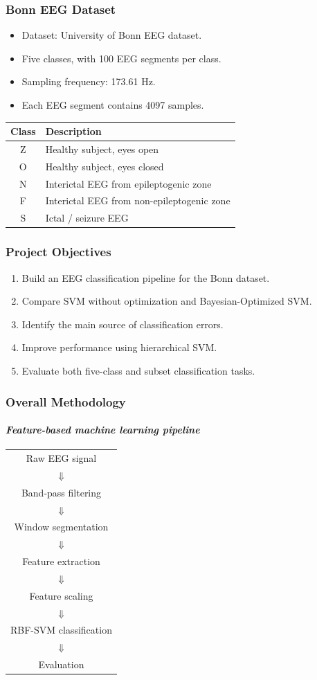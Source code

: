 \documentclass{beamer}
\begin{document}
\begin{frame}
\frametitle{Bonn EEG Dataset}
\begin{itemize}
\item Dataset: University of Bonn EEG dataset.
\item Five classes, with 100 EEG segments per class.
\item Sampling frequency: 173.61 Hz.
\item Each EEG segment contains 4097 samples.
\end{itemize}

\begin{table}
\centering
\begin{tabular}{cl}
\toprule
Class & Description\\
\midrule
Z & Healthy subject, eyes open\\
O & Healthy subject, eyes closed\\
N & Interictal EEG from epileptogenic zone\\
F & Interictal EEG from non-epileptogenic zone\\
S & Ictal / seizure EEG\\
\bottomrule
\end{tabular}
\end{table}
\end{frame}

\begin{frame}
\frametitle{Project Objectives}
\begin{enumerate}
\item Build an EEG classification pipeline for the Bonn dataset.
\item Compare SVM without optimization and Bayesian-Optimized SVM.
\item Identify the main source of classification errors.
\item Improve performance using hierarchical SVM.
\item Evaluate both five-class and subset classification tasks.
\end{enumerate}
\end{frame}

\begin{frame}
\frametitle{Overall Methodology}
\framesubtitle{\it{Feature-based machine learning pipeline}}
\begin{center}
\begin{tabular}{c}
Raw EEG signal\\
$\Downarrow$\\
Band-pass filtering\\
$\Downarrow$\\
Window segmentation\\
$\Downarrow$\\
Feature extraction\\
$\Downarrow$\\
Feature scaling\\
$\Downarrow$\\
RBF-SVM classification\\
$\Downarrow$\\
Evaluation
\end{tabular}
\end{center}
\end{frame}
\end{document}
